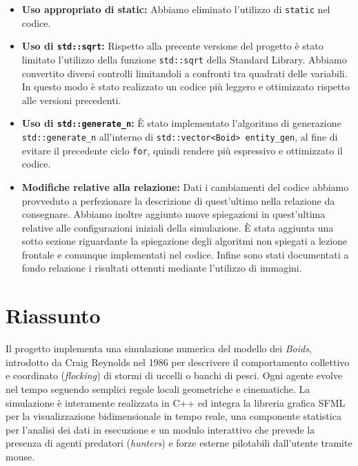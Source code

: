 \documentclass[11pt, a4paper]{article}
\begin{document}
\begin{itemize}
    A tal proposito abbiamo dovuto modificare interamente la logica di programmazione, dal momento che inizialmente si confrontavano \texttt{boids} appartenenti a due flock diversi (\texttt{flock}, \texttt{next\_flock}). Come conseguenza è variato il codice inerente al metodo \texttt{Boid::update} che restituisce una copia modificata che viene, in seguito all'applicazione di forze attraverso \texttt{Boid::apply\_force}, inserita in \texttt{next\_flock}. 
    \item \textbf{Uso appropriato di static: }Abbiamo eliminato l'utilizzo di \texttt{static} nel codice.
    \item \textbf{Uso di \texttt{std::sqrt}: }Rispetto alla precente versione del progetto è stato limitato l'utilizzo della funzione \texttt{std::sqrt} della Standard Library. Abbiamo convertito diversi controlli limitandoli a confronti tra quadrati delle variabili. In questo modo è stato realizzato un codice più leggero e ottimizzato rispetto alle versioni precedenti.
    \item \textbf{Uso di \texttt{std::generate\_n}: }È stato implementato l'algoritmo di generazione \texttt{std::generate\_n} all'interno di \texttt{std::vector<Boid> entity\_gen}, al fine di evitare il precedente ciclo \texttt{for}, quindi rendere più espressivo e ottimizzato il codice.
    \item \textbf{Modifiche relative alla relazione: }Dati i cambiamenti del codice abbiamo provveduto a perfezionare la descrizione di quest'ultimo nella relazione da consegnare. Abbiamo inoltre aggiunto nuove spiegazioni in quest'ultima relative alle configurazioni iniziali della simulazione. È stata aggiunta una sotto sezione riguardante la spiegazione degli algoritmi non spiegati a lezione frontale e comunque implementati nel codice. Infine sono stati documentati a fondo relazione i risultati ottenuti mediante l'utilizzo di immagini.

\end{itemize}
\section*{Riassunto}
Il progetto implementa una simulazione numerica del modello dei \textit{Boids}, introdotto da Craig Reynolds nel 1986 per descrivere il comportamento collettivo e coordinato (\textit{flocking}) di stormi di uccelli o banchi di pesci. Ogni agente evolve nel tempo seguendo semplici regole locali geometriche e cinematiche. La simulazione è interamente realizzata in C++ ed integra la libreria grafica SFML per la visualizzazione bidimensionale in tempo reale, una componente statistica per l'analisi dei dati in esecuzione e un modulo interattivo che prevede la presenza di agenti predatori (\textit{hunters}) e forze esterne pilotabili dall'utente tramite mouse.
\end{document}
